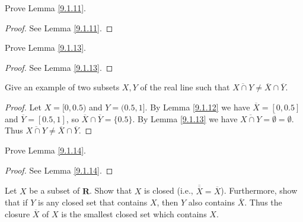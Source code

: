 \begin{exercise}\label{ex 9.1.2}
    Prove Lemma \ref{9.1.11}.
\end{exercise}

\begin{proof}
    See Lemma \ref{9.1.11}.
\end{proof}

\begin{exercise}\label{ex 9.1.3}
    Prove Lemma \ref{9.1.13}.
\end{exercise}

\begin{proof}
    See Lemma \ref{9.1.13}.
\end{proof}

\begin{exercise}\label{ex 9.1.4}
    Give an example of two subsets \(X, Y\) of the real line such that \(\overline{X \cap Y} \neq \overline{X} \cap \overline{Y}\).
\end{exercise}

\begin{proof}
    Let \(X = [0, 0.5)\) and \(Y = (0.5, 1]\).
    By Lemma \ref{9.1.12} we have \(\overline{X} = [0, 0.5]\) and \(\overline{Y} = [0.5, 1]\), so \(\overline{X} \cap \overline{Y} = \{0.5\}\).
    By Lemma \ref{9.1.13} we have \(\overline{X \cap Y} = \overline{\emptyset} = \emptyset\).
    Thus \(\overline{X \cap Y} \neq \overline{X} \cap \overline{Y}\).
\end{proof}

\begin{exercise}\label{ex 9.1.5}
    Prove Lemma \ref{9.1.14}.
\end{exercise}

\begin{proof}
    See Lemma \ref{9.1.14}.
\end{proof}

\begin{exercise}\label{ex 9.1.6}
    Let \(X\) be a subset of \(\mathbf{R}\).
    Show that \(X\) is closed (i.e., \(\overline{\overline{X}} = \overline{X}\)).
    Furthermore, show that if \(Y\) is any closed set that contains \(X\), then \(Y\) also contains \(\overline{X}\).
    Thus the closure \(\overline{X}\) of \(X\) is the smallest closed set which contains \(X\).
\end{exercise}

